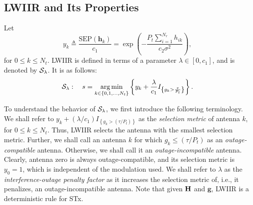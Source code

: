 \documentclass[journal]{IEEEtran}
\newcommand{\cbrac}[1]{\left\{{#1}\right\}}
\newcommand{\indic}[1]{I_{\cbrac{#1}}}
\newcommand{\define}{\triangleq}
\newcommand{\mtx}[1]{{\bf #1}} %
\DeclareMathOperator*{\argmin}{arg\,min}
\newcommand{\SEP}{\text{SEP}}
\newcommand{\nx}{{0}}
\newcommand{\lam}{\lambda}
\newcommand{\Nt}{{N_t}}
\newcommand{\Nr}{{N_r}}
\newcommand{\Pt}{{P_t}}
\newcommand{\such}{h}
\newcommand{\puch}{g}
\newcommand{\hk}[1]{{\such_{#1}}}
\newcommand{\gk}[1]{{\puch_{#1}}}
\newcommand{\g}{\mathbf{\puch}}
\newcommand{\noisevar}{\sigma^2}
\newcommand{\itau}{\tau}
\newcommand{\cone}{c_{1}}
\newcommand{\ctwo}{c_{2}}
\newcommand{\taubypt}{\frac{\itau}{\Pt}}
\newcommand{\taubyptinl}{{\itau}/{\Pt}}
\newcommand{\gkgrtaubypt}[1]{{\gk{#1}}>\taubypt}
\newcommand{\gkgrtaubyptinl}[1]{{\gk{#1}}>\left( \taubyptinl \right) }
\newcommand{\gklttaubyptinl}[1]{{\gk{#1}}\leq\left( \taubyptinl \right) }
\newcommand{\gindic}[1]{\indic{\gkgrtaubypt{#1}}}
\newcommand{\gindicinl}[1]{\indic{\gkgrtaubyptinl{#1}}}
\newcommand{\lambycone}{\frac{\lam}{\cone}}
\newcommand{\lambyconeinl}{\lam/\cone}
\newcommand{\yk}[1]{y_{#1}}
\newcommand{\ykplusgk}[1]{ \yk{#1} + \lambycone\gindic{#1}}
\newcommand{\ykplusgkinl}[1]{ \yk{#1} + \left( \lambyconeinl\right) \gindicinl{#1}}
\newcommand{\allopts}{\left\{\nx,1,\ldots,\Nt\right\}}
\newcommand{\Hmx}{\mtx{H}}
\newcommand{\callamrule}{{\cal S_{{\lam}}}}
\newcommand{\bhk}[1]{\mathbf{\such}_{#1}}
\begin{document}
\subsection{LWIIR and Its Properties}
\label{sec:lambda_rule}
Let 
\begin{equation}
\yk{k} \define \frac{\SEP(\bhk{k})}{\cone} = \exp\left({- \frac{\Pt\sum_{i=1}^{\Nr}\hk{ik}}{\ctwo\noisevar} }\right),  
\label{eq:yi_def}
\end{equation}
for  $0\leq k \leq\Nt$. LWIIR is defined in terms of a parameter $\lam \in \left[0, \cone\right]$, and is denoted by $\callamrule$. It is as follows:
\begin{equation}
\callamrule: \quad s=\argmin\limits_{k\in\allopts} \left\{ \ykplusgk{k} \right\}.
\label{eq:lam_weight_rule}
\end{equation}

To understand the behavior of $\callamrule$, we first introduce the following terminology. We shall refer to $\ykplusgkinl{k}$ as the {\em selection metric} of antenna $k$, for $0\leq k \leq\Nt$. Thus, LWIIR selects the antenna with the smallest selection metric. Further, we shall call an antenna $k$ for which $\gklttaubyptinl{k} $ as an {\em outage-compatible} antenna. Otherwise, we shall call it an {\em outage-incompatible} antenna.  Clearly, antenna zero is always outage-compatible, and its selection metric is $\yk{0}=1$, which is independent of the modulation used. We shall refer to $\lam$ as the {\em interference-outage penalty factor} as it increases the selection metric of, i.e., it penalizes, an outage-incompatible antenna. Note that given $\Hmx$ and $\g$, LWIIR is a deterministic rule for STx.
\end{document}
